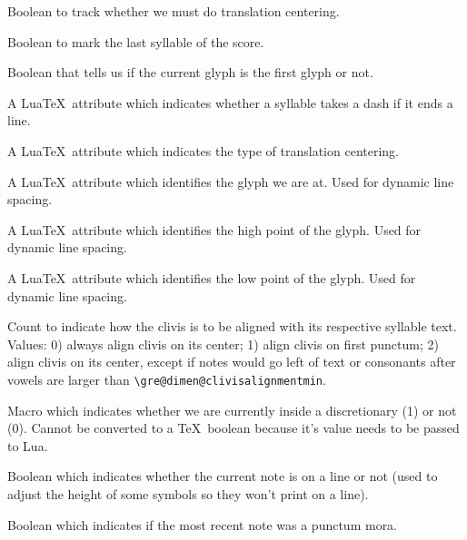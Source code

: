 Boolean to track whether we must do translation centering.

Boolean to mark the last syllable of the score.

Boolean that tells us if the current glyph is the first glyph or not.

A Lua\TeX\ attribute which indicates whether a syllable takes a dash if it ends a line.  

A Lua\TeX\ attribute which indicates the type of translation centering.

A Lua\TeX\ attribute which identifies the glyph we are at.  Used for dynamic line spacing.

A Lua\TeX\ attribute which identifies the high point of the glyph.  Used for dynamic line spacing.

A Lua\TeX\ attribute which identifies the low point of the glyph.  Used for dynamic line spacing.

Count to indicate how the clivis is to be aligned with its respective syllable text.  Values: 0) always align clivis on its center; 1) align clivis on first punctum; 2) align clivis on its center, except if notes would go left of text or consonants after vowels are larger than \verb=\gre@dimen@clivisalignmentmin=.

Macro which indicates whether we are currently inside a discretionary (1) or not (0).  Cannot be converted to a \TeX\ boolean because it's value needs to be passed to Lua.

Boolean which indicates whether the current note is on a line or not (used to adjust the height of some symbols so they won't print on a line).

Boolean which indicates if the most recent note was a punctum mora.

